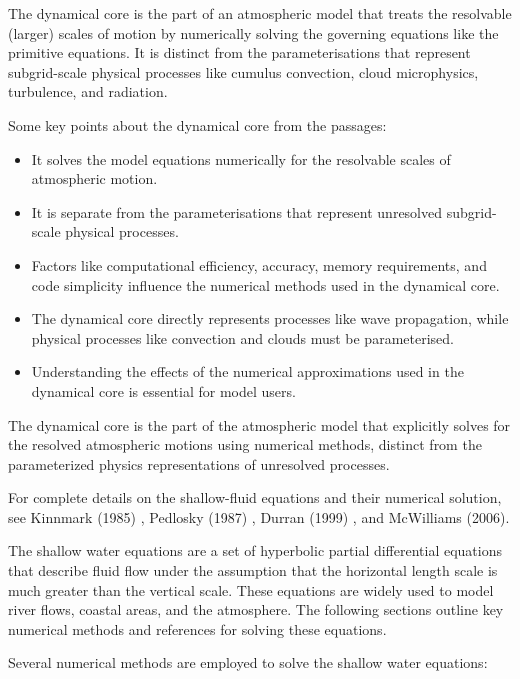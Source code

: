 \documentclass{article}
\begin{document}
The dynamical core is the part of an atmospheric model that treats the resolvable (larger) scales of motion by numerically solving the governing equations like the primitive equations. It is distinct from the parameterisations that represent subgrid-scale physical processes like cumulus convection, cloud microphysics, turbulence, and radiation.

Some key points about the dynamical core from the passages:
\begin{itemize}
\item It solves the model equations numerically for the resolvable scales of atmospheric motion.

\item It is separate from the parameterisations that represent unresolved subgrid-scale physical processes.

\item Factors like computational efficiency, accuracy, memory requirements, and code simplicity influence the numerical methods used in the dynamical core.

\item The dynamical core directly represents processes like wave propagation, while physical processes like convection and clouds must be parameterised.

\item Understanding the effects of the numerical approximations used in the dynamical core is essential for model users.
\end{itemize}

The dynamical core is the part of the atmospheric model that explicitly solves for the resolved atmospheric motions using numerical methods, distinct from the parameterized physics representations of unresolved processes.


For complete details on the shallow-fluid equations and their numerical solution, see Kinnmark (1985) \cite{kinnmark1985}, Pedlosky (1987) \cite{pedlosky1987} , Durran (1999) \cite{durran1999}
, and McWilliams (2006)\cite{mcwilliams2006}.

The shallow water equations are a set of hyperbolic partial differential equations that describe fluid flow under the assumption that the horizontal length scale is much greater than the vertical scale. These equations are widely used to model river flows, coastal areas, and the atmosphere. The following sections outline key numerical methods and references for solving these equations.

Several numerical methods are employed to solve the shallow water equations:
\end{document}
